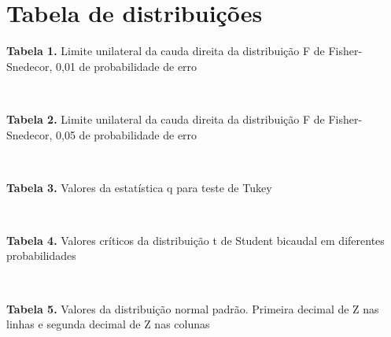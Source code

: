 \documentclass[
]{book}
\begin{document}
\hypertarget{tabela-de-distribuiuxe7uxf5es}{%
\chapter*{Tabela de distribuições}\label{tabela-de-distribuiuxe7uxf5es}}

\textbf{Tabela 1.} Limite unilateral da cauda direita da distribuição F de Fisher-Snedecor, 0,01 de probabilidade de erro

\hypertarget{htmlwidget-603bf85778df954412de}{}
\begin{datatables}

\end{datatables}

\(~\)
\(~\)
\(~\)

\textbf{Tabela 2.} Limite unilateral da cauda direita da distribuição F de Fisher-Snedecor, 0,05 de probabilidade de erro

\hypertarget{htmlwidget-dcfec55c959d43683d4b}{}
\begin{datatables}

\end{datatables}

\(~\)
\(~\)
\(~\)

\textbf{Tabela 3.} Valores da estatística q para teste de Tukey

\hypertarget{htmlwidget-27f5ba04f7013aab17e5}{}
\begin{datatables}

\end{datatables}

\(~\)
\(~\)
\(~\)

\textbf{Tabela 4.} Valores críticos da distribuição t de Student bicaudal em diferentes probabilidades

\hypertarget{htmlwidget-716dbe7626cee43b9ee8}{}
\begin{datatables}

\end{datatables}

\(~\)
\(~\)
\(~\)

\textbf{Tabela 5.} Valores da distribuição normal padrão. Primeira decimal de Z nas linhas e segunda decimal de Z nas colunas

\hypertarget{htmlwidget-6e8519f63fbfa7808acd}{}
\begin{datatables}

\end{datatables}

\(~\)
\(~\)
\(~\)
\end{document}
